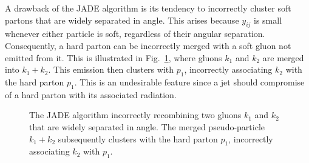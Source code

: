A drawback of the JADE algorithm is its tendency to incorrectly cluster 
soft partons that are widely separated in angle. This arises because 
$y_{ij}$ is small whenever either particle is soft, regardless of their 
angular separation. Consequently, a hard parton can be incorrectly merged 
with a soft gluon not emitted from it. This is illustrated in 
Fig.~\ref{fig:JADE}, where gluons $k_1$ and $k_2$ are merged into 
$k_1+k_2$. This emission then clusters with $p_1$, incorrectly associating $k_2$ 
with the hard parton $p_1$. This is an undesirable feature since a jet should compromise of 
a hard parton with its associated radiation.
\begin{figure}[h]
\centering
{}
\caption{The JADE algorithm incorrectly recombining two gluons $k_1$ and 
$k_2$ that are widely separated in angle. The merged pseudo-particle 
$k_1+k_2$ subsequently clusters with the hard parton $p_1$, 
incorrectly associating $k_2$ with $p_1$. }
\label{fig:JADE}
\end{figure}

